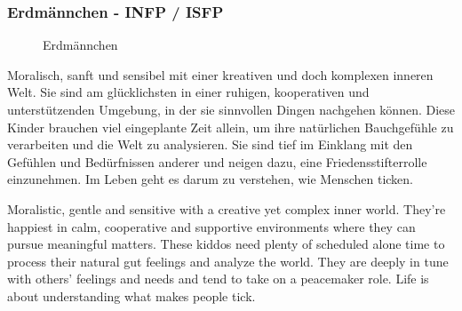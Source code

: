 \subsubsection{Erdmännchen - INFP / ISFP}
\begin{figure}[htbp!]
	\centering
	\caption[Erdmännchen]{Erdmännchen \cite{knowAndLove}}
	\label{img:Elephant}
\end{figure}
Moralisch, sanft und sensibel mit einer kreativen und doch komplexen inneren Welt. Sie sind am glücklichsten in einer ruhigen, kooperativen und unterstützenden Umgebung, in der sie sinnvollen Dingen nachgehen können. Diese Kinder brauchen viel eingeplante Zeit allein, um ihre natürlichen Bauchgefühle zu verarbeiten und die Welt zu analysieren. Sie sind tief im Einklang mit den Gefühlen und Bedürfnissen anderer und neigen dazu, eine Friedensstifterrolle einzunehmen. Im Leben geht es darum zu verstehen, wie Menschen ticken. 

Moralistic, gentle and sensitive with a creative yet complex inner world. They're happiest in calm, cooperative and supportive environments where they can pursue meaningful matters. These kiddos need plenty of scheduled alone time to process their natural gut feelings and analyze the world. They are deeply in tune with others' feelings and needs and tend to take on a peacemaker role. Life is about understanding what makes people tick. \\	
